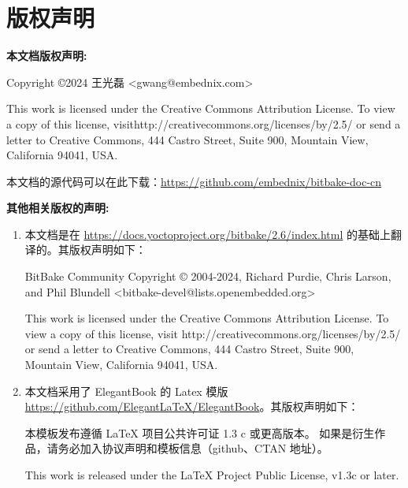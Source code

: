 \chapter*{版权声明}

\textbf{本文档版权声明:}

Copyright \copyright 2024 王光磊 <gwang@embednix.com>

This work is licensed under the Creative Commons Attribution License. To view a copy of this license, visit\linebreak http://creativecommons.org/licenses/by/2.5/ or send a letter to Creative Commons, 444 Castro Street, Suite 900, Mountain View, California 94041, USA.

本文档的源代码可以在此下载：\url{https://github.com/embednix/bitbake-doc-cn}


\textbf{其他相关版权的声明:}

\begin{enumerate}    
\item 本文档是在 \url{https://docs.yoctoproject.org/bitbake/2.6/index.html} 的基础上翻译的。其版权声明如下：

\medskip
BitBake Community
Copyright © 2004-2024, Richard Purdie, Chris Larson, and Phil Blundell\linebreak
<bitbake-devel@lists.openembedded.org>

\medskip
This work is licensed under the Creative Commons Attribution License. To view a copy of this license, visit \linebreak http://creativecommons.org/licenses/by/2.5/ or send a letter to Creative Commons, 444 Castro Street, Suite 900, Mountain View, California 94041, USA.

\medskip
\item 本文档采用了 ElegantBook 的 Latex 模版 \url{https://github.com/ElegantLaTeX/ElegantBook}。其版权声明如下：

\medskip
本模板发布遵循 LaTeX 项目公共许可证 1.3 c 或更高版本。 如果是衍生作品，请务必加入协议声明和模板信息（github、CTAN 地址）。

\medskip
This work is released under the LaTeX Project Public License, v1.3c or later.
\end{enumerate}


